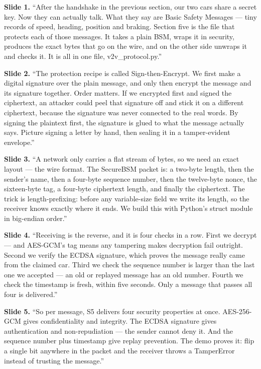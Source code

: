 \documentclass[11pt,a4paper]{report}
\begin{document}
\textbf{Slide 1.} ``After the handshake in the previous section, our two cars
share a secret key. Now they can actually talk. What they say are Basic Safety
Messages --- tiny records of speed, heading, position and braking. Section five
is the file that protects each of those messages. It takes a plain BSM, wraps it
in security, produces the exact bytes that go on the wire, and on the other side
unwraps it and checks it. It is all in one file, v2v\_protocol.py.''

\textbf{Slide 2.} ``The protection recipe is called Sign-then-Encrypt. We first
make a digital signature over the plain message, and only then encrypt the
message and its signature together. Order matters. If we encrypted first and
signed the ciphertext, an attacker could peel that signature off and stick it on
a different ciphertext, because the signature was never connected to the real
words. By signing the plaintext first, the signature is glued to what the
message actually says. Picture signing a letter by hand, then sealing it in a
tamper-evident envelope.''

\textbf{Slide 3.} ``A network only carries a flat stream of bytes, so we need an
exact layout --- the wire format. The SecureBSM packet is: a two-byte length,
then the sender's name, then a four-byte sequence number, then the twelve-byte
nonce, the sixteen-byte tag, a four-byte ciphertext length, and finally the
ciphertext. The trick is length-prefixing: before any variable-size field we
write its length, so the receiver knows exactly where it ends. We build this with
Python's struct module in big-endian order.''

\textbf{Slide 4.} ``Receiving is the reverse, and it is four checks in a row.
First we decrypt --- and AES-GCM's tag means any tampering makes decryption fail
outright. Second we verify the ECDSA signature, which proves the message really
came from the claimed car. Third we check the sequence number is larger than the
last one we accepted --- an old or replayed message has an old number. Fourth we
check the timestamp is fresh, within five seconds. Only a message that passes all
four is delivered.''

\textbf{Slide 5.} ``So per message, S5 delivers four security properties at once.
AES-256-GCM gives confidentiality and integrity. The ECDSA signature gives
authentication and non-repudiation --- the sender cannot deny it. And the
sequence number plus timestamp give replay prevention. The demo proves it: flip
a single bit anywhere in the packet and the receiver throws a TamperError instead
of trusting the message.''
\end{document}
